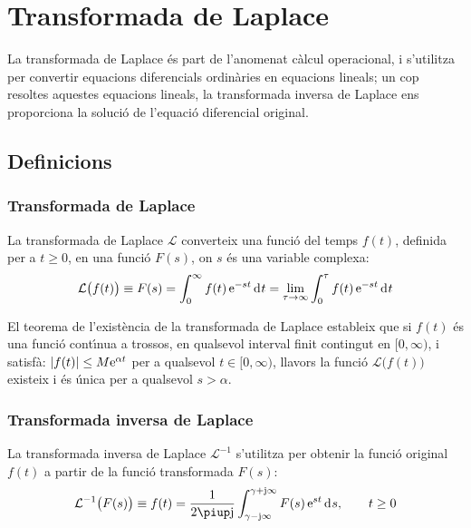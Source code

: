 \chapter{Transformada de
Laplace}\label{sec:laplace}

La transformada de Laplace \'{e}s part de l'anomenat c\`{a}lcul operacional,
i s'utilitza per convertir equacions diferencials ordin\`{a}ries en
equacions lineals; un cop resoltes aquestes equacions lineals, la
transformada inversa de Laplace ens proporciona la soluci\'{o} de
l'equaci\'{o} diferencial original.

\section{Definicions}

\subsection{Transformada de Laplace}

La transformada de Laplace $\mathcal{L}$  converteix una funci\'{o} del
temps $f(t)$, definida per a $t\geq 0$, en una funci\'{o} $F(s)$, on $s$
\'{e}s una variable complexa:
\begin{equation}
    \mathcal{L}\bigl(f(t)\bigr) \equiv F(s) = \int_0^\infty f(t) \,\eu^{-s t} \diff t =
    \lim_{\tau\to\infty} \int_0^\tau f(t) \,\eu^{-s t} \diff t \label{eq:transf_laplace}
\end{equation}

El teorema de l'exist\`{e}ncia de la transformada de Laplace estableix
que si $f(t)$ \'{e}s una funci\'{o} cont\'{\i}nua a trossos, en qualsevol
interval finit contingut en $[0,\infty)$, i satisf\`{a}: $|f(t)| \leq M
\mathrm{e}^{\alpha t}$ per a qualsevol $t \in [0,\infty)$, llavors la
funci\'{o} $\mathcal{L}\bigl(f(t)\bigr)$ existeix i \'{e}s \'{u}nica per a
qualsevol $s > \alpha$.

\subsection{Transformada inversa de Laplace}

La transformada inversa de Laplace $\mathcal{L}^{-1}$ s'utilitza per
obtenir la funci\'{o} original $f(t)$ a partir de la funci\'{o}
transformada $F(s)$:
\begin{equation}
    \mathcal{L}^{-1}\bigl(F(s)\bigr) \equiv f(t) = \frac{1}{2 \piup \ju }
    \int_{\gamma-\ju \infty}^{\gamma+\ju \infty} F(s)\, \eu^{s t} \diff s
    ,\qquad t\geq 0 \label{eq:transf_inv_laplace}
\end{equation}

